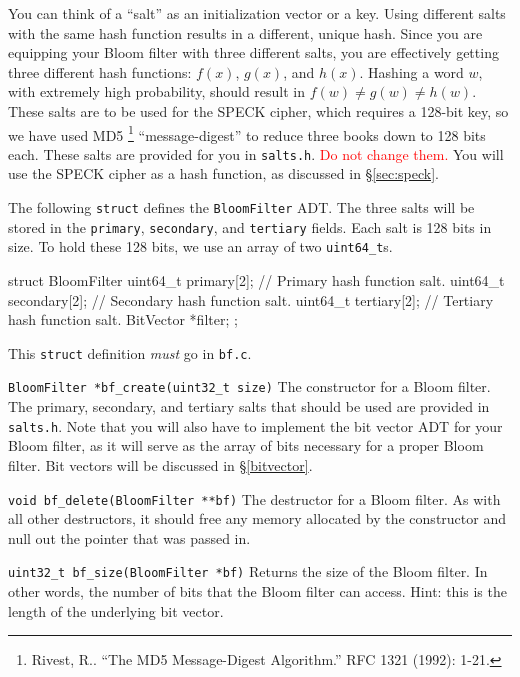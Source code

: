 You can think of a ``salt'' as an initialization vector or a key. Using
different salts with the same hash function results in a different, unique hash.
Since you are equipping your Bloom filter with three different salts, you are
effectively getting three different hash functions: $f(x)$, $g(x)$, and $h(x)$.
Hashing a word $w$, with extremely high probability, should result in $f(w) \ne
g(w) \ne h(w)$. These salts are to be used for the SPECK cipher, which requires
a 128-bit key, so we have used MD5 \footnote{Rivest, R.. “The MD5 Message-Digest
Algorithm.” RFC 1321 (1992): 1-21.} ``message-digest'' to reduce three books
down to 128 bits each. These salts are provided for you in \texttt{salts.h}.
\textcolor{red}{Do not change them.} You will use the SPECK cipher as a hash
function, as discussed in \S\ref{sec:speck}.

The following \texttt{struct} defines the \texttt{BloomFilter} ADT. The three
salts will be stored in the \texttt{primary}, \texttt{secondary}, and
\texttt{tertiary} fields. Each salt is 128 bits in size. To hold these 128 bits,
we use an array of two \texttt{uint64\_t}s.

\begin{clisting}{}
struct BloomFilter {
  uint64_t primary[2];   // Primary hash function salt.
  uint64_t secondary[2]; // Secondary hash function salt.
  uint64_t tertiary[2];  // Tertiary hash function salt.
  BitVector *filter;
};
\end{clisting}

This \texttt{struct} definition \emph{must} go in \texttt{bf.c}.

\begin{funcdoc}{\texttt{BloomFilter *bf\_create(uint32\_t size)}}
  The constructor for a Bloom filter. The primary, secondary, and
  tertiary salts that should be used are provided in \texttt{salts.h}.
  Note that you will also have to implement the bit vector ADT for your
  Bloom filter, as it will serve as the array of bits necessary for a
  proper Bloom filter. Bit vectors will be discussed in
  \S\ref{bitvector}.
\end{funcdoc}

\begin{funcdoc}{\texttt{void bf\_delete(BloomFilter **bf)}}
  The destructor for a Bloom filter. As with all other destructors, it
  should free any memory allocated by the constructor and null out the
  pointer that was passed in.
\end{funcdoc}

\begin{funcdoc}{\texttt{uint32\_t bf\_size(BloomFilter *bf)}}
  Returns the size of the Bloom filter. In other words, the number of
  bits that the Bloom filter can access. Hint: this is the length of the
  underlying bit vector.
\end{funcdoc}

